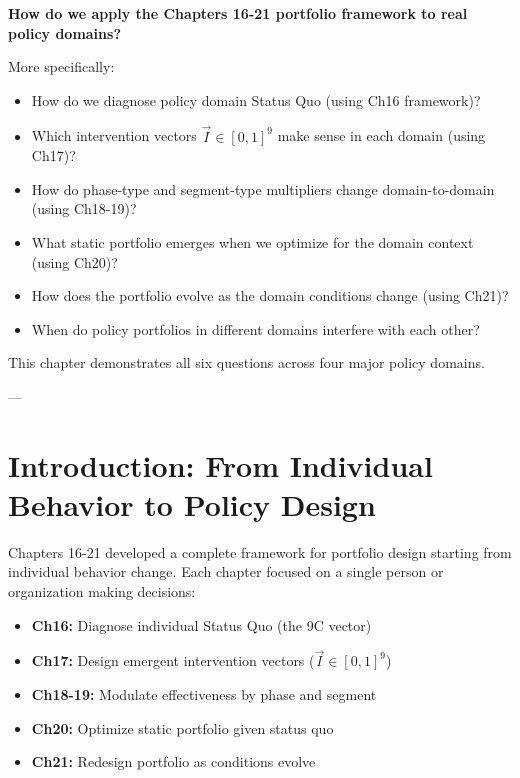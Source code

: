 \begin{tcolorbox}[colback=red!5!white, colframe=red!75!black, title=Central Question of This Chapter]

\textbf{How do we apply the Chapters 16-21 portfolio framework to real policy domains?}

\vspace{0.3cm}

More specifically:
\begin{itemize}
\item How do we diagnose policy domain Status Quo (using Ch16 framework)?
\item Which intervention vectors $\vec{I} \in [0,1]^9$ make sense in each domain (using Ch17)?
\item How do phase-type and segment-type multipliers change domain-to-domain (using Ch18-19)?
\item What static portfolio emerges when we optimize for the domain context (using Ch20)?
\item How does the portfolio evolve as the domain conditions change (using Ch21)?
\item When do policy portfolios in different domains interfere with each other?
\end{itemize}

This chapter demonstrates all six questions across four major policy domains.

\end{tcolorbox}

---


\section{Introduction: From Individual Behavior to Policy Design}
\label{sec:ch22-intro}

Chapters 16-21 developed a complete framework for portfolio design starting from individual behavior change. Each chapter focused on a single person or organization making decisions:

\begin{itemize}
\item \textbf{Ch16:} Diagnose individual Status Quo (the 9C vector)
\item \textbf{Ch17:} Design emergent intervention vectors ($\vec{I} \in [0,1]^9$)
\item \textbf{Ch18-19:} Modulate effectiveness by phase and segment
\item \textbf{Ch20:} Optimize static portfolio given status quo
\item \textbf{Ch21:} Redesign portfolio as conditions evolve
\end{itemize}

